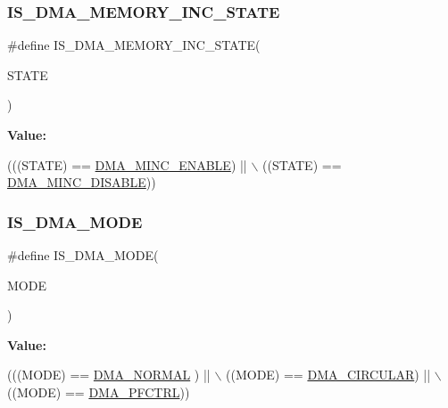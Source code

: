 \subsubsection{\texorpdfstring{I\+S\+\_\+\+D\+M\+A\+\_\+\+M\+E\+M\+O\+R\+Y\+\_\+\+I\+N\+C\+\_\+\+S\+T\+A\+TE}{IS\_DMA\_MEMORY\_INC\_STATE}}
{\footnotesize\ttfamily \#define I\+S\+\_\+\+D\+M\+A\+\_\+\+M\+E\+M\+O\+R\+Y\+\_\+\+I\+N\+C\+\_\+\+S\+T\+A\+TE(\begin{DoxyParamCaption}\item[{}]{S\+T\+A\+TE }\end{DoxyParamCaption})}

{\bfseries Value\+:}
\begin{DoxyCode}
(((STATE) == \hyperlink{group___d_m_a___memory__incremented__mode_ga43d30885699cc8378562316ff4fed1cd}{DMA\_MINC\_ENABLE})  || \(\backslash\)
                                        ((STATE) == \hyperlink{group___d_m_a___memory__incremented__mode_ga32625330516c188151743473fad97a33}{DMA\_MINC\_DISABLE}))
\end{DoxyCode}
\mbox{\label{group___d_m_a___private___macros_gad88ee5030574d6a573904378fb62c7ac}} 
\subsubsection{\texorpdfstring{I\+S\+\_\+\+D\+M\+A\+\_\+\+M\+O\+DE}{IS\_DMA\_MODE}}
{\footnotesize\ttfamily \#define I\+S\+\_\+\+D\+M\+A\+\_\+\+M\+O\+DE(\begin{DoxyParamCaption}\item[{}]{M\+O\+DE }\end{DoxyParamCaption})}

{\bfseries Value\+:}
\begin{DoxyCode}
(((MODE) == \hyperlink{group___d_m_a__mode_ga04941acfbbdefc53e1e08133cffa3b8a}{DMA\_NORMAL} )  || \(\backslash\)
                           ((MODE) == \hyperlink{group___d_m_a__mode_ga4c4f425cba13edffb3c831c036c91e01}{DMA\_CIRCULAR}) || \(\backslash\)
                           ((MODE) == \hyperlink{group___d_m_a__mode_ga7974ee645c8e275a2297cf37eec9e022}{DMA\_PFCTRL}))
\end{DoxyCode}
\mbox{\label{group___d_m_a___private___macros_ga7c60961178e2a32e9e364a220a8aca88}} 
